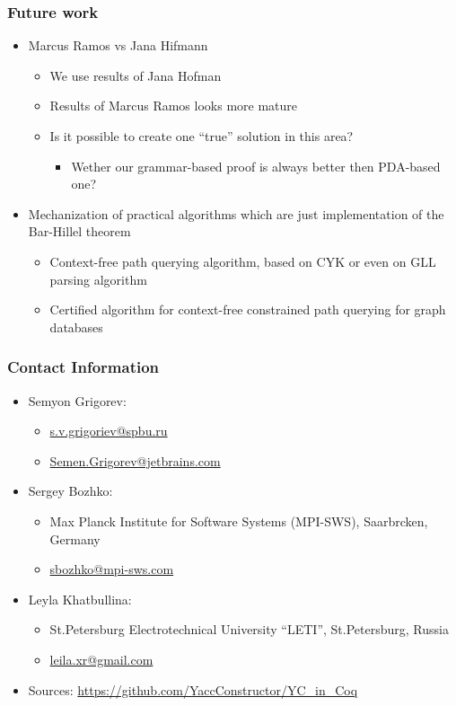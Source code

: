 \documentclass[xcolor=table]{beamer}
\begin{document}
\begin{frame} \frametitle{Future work}

\begin{itemize}
 \item Marcus Ramos vs Jana Hifmann
 \begin{itemize}
   \item We use results of Jana Hofman
   \item Results of Marcus Ramos looks more mature
   \item Is it possible to create one ``true'' solution in this area?
   \begin{itemize}
     \item Wether our grammar-based proof is always better then PDA-based one?
   \end{itemize}
 \end{itemize}
 \pause
 \item Mechanization of practical algorithms which are just implementation of the Bar-Hillel theorem
 \begin{itemize}
   \item Context-free path querying algorithm, based on CYK or even on GLL parsing algorithm
   \item Certified algorithm for context-free constrained path querying for graph databases
 \end{itemize}
\end{itemize}

\end{frame}



\begin{frame}
\frametitle{Contact Information}
\begin{itemize}
  \item Semyon Grigorev:
    \begin{itemize}
      \item \href{mailto:s.v.grigoriev@spbu.ru}{s.v.grigoriev@spbu.ru}
      \item \href{mailto:Semen.Grigorev@jetbrains.com}{Semen.Grigorev@jetbrains.com}
    \end{itemize}
  \item Sergey Bozhko:
  \begin{itemize}
    \item  Max Planck Institute for Software Systems (MPI-SWS), Saarbrcken, Germany
    \item  \href{mailto:sbozhko@mpi-sws.com}{sbozhko@mpi-sws.com}
  \end{itemize}
    \item Leyla Khatbullina:
  \begin{itemize}
    \item St.Petersburg Electrotechnical University ``LETI'', St.Petersburg, Russia
    \item  \href{mailto:leila.xr@gmail.com}{leila.xr@gmail.com}
  \end{itemize}
  \item Sources: \href{https://github.com/YaccConstructor/YC_in_Coq}{https://github.com/YaccConstructor/YC\_in\_Coq}
\end{itemize}
\vspace{0.5cm}
\end{frame}
\end{document}
